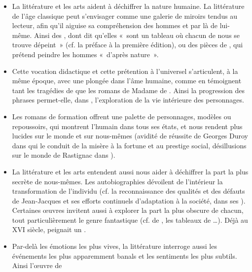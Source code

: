{\begin{itemize}
\item La littérature et les arts aident à déchiffrer la nature humaine. La littérature de l'âge
classique peut s'envisager comme une galerie de miroirs tendus au lecteur, afin qu'il
aiguise sa compréhension des hommes et par là de lui-même. Ainsi des , dont
 dit qu'elles «~sont un tableau où chacun de nous se trouve dépeint~» (cf.
la préface à la première édition), ou des pièces de , qui prétend peindre les
hommes «~d'après nature~».
\item Cette vocation didactique et cette prétention à l'universel s'articulent, à la même
époque, avec une plongée dans l'âme humaine, comme en témoignent tant les
tragédies de  que les romans de Madame de . Ainsi la progression
des phrases permet-elle, dans , l'exploration de la vie intérieure
des personnages.
\item Les romans de formation offrent une palette de personnages, modèles ou
repoussoirs, qui montrent l'humain dans tous ses états, et nous rendent plus lucides
sur le monde et sur nous-mêmes (avidité de réussite de Georges Duroy dans 
qui le conduit de la misère à la fortune et au prestige social, désillusions sur le monde
de Rastignac dans ).
\item La littérature et les arts entendent aussi nous aider à déchiffrer la part la plus secrète
de nous-mêmes. Les autobiographies dévoilent de l'intérieur la transformation de
l'individu (cf. la reconnaissance des qualités et des défauts de Jean-Jacques
 et ses efforts continuels d'adaptation à la société, dans ses ).
Certaines œuvres invitent aussi à explorer la part la plus obscure de chacun, tout
particulièrement le genre fantastique (cf.  de , les tableaux de
…). Déjà au XVI\ieme{} siècle,  peignait un .
\item Par-delà les émotions les plus vives, la littérature interroge aussi les événements les
plus apparemment banals et les sentiments les plus subtils. Ainsi l'œuvre de 

\end{itemize}}
